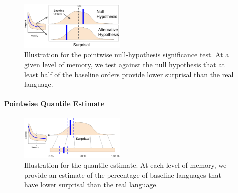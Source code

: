\documentclass[11pt,letterpaper]{article}
\begin{document}



\begin{figure}
	\begin{center}
\includegraphics[width=0.45\textwidth]{figures/nhst.png}
\end{center}
	\caption{Illustration for the pointwise null-hypothesis significance test. At a given level of memory, we test against the null hypothesis that at least half of the baseline orders provide lower surprisal than the real language.}\label{fig:nhst-pointwise}
\end{figure}











\paragraph{Pointwise Quantile Estimate}

\begin{figure}
	\begin{center}
\includegraphics[width=0.45\textwidth]{figures/quantile.png}
\end{center}
	\caption{Illustration for the quantile estimate. At each level of memory, we provide an estimate of the percentage of baseline languages that have lower surprisal than the real language.}\label{fig:quantile-pointwise}
\end{figure}
\end{document}
